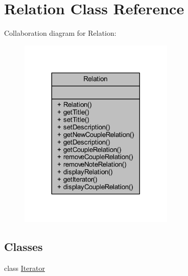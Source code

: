 \hypertarget{class_relation}{}\section{Relation Class Reference}
\label{class_relation}


Collaboration diagram for Relation\+:
\nopagebreak
\begin{figure}[H]
\begin{center}
\leavevmode
\includegraphics[width=209pt]{class_relation__coll__graph}
\end{center}
\end{figure}
\subsection*{Classes}
\begin{DoxyCompactItemize}
\item 
class \hyperlink{class_relation_1_1_iterator}{Iterator}
\end{DoxyCompactItemize}
